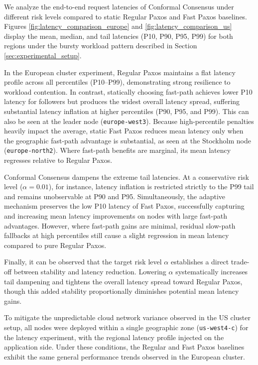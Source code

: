 We analyze the end-to-end request latencies of Conformal Consensus under different risk levels compared to static Regular Paxos and Fast Paxos baselines. Figures \ref{fig:latency_comparison_europe} and \ref{fig:latency_comparison_us} display the mean, median, and tail latencies (P10, P90, P95, P99) for both regions under the bursty workload pattern described in Section \ref{sec:experimental_setup}.

In the European cluster experiment, Regular Paxos maintains a flat latency profile across all percentiles (P10--P99), demonstrating strong resilience to workload contention. In contrast, statically choosing fast-path achieves lower P10 latency for followers but produces the widest overall latency spread, suffering substantial latency inflation at higher percentiles (P90, P95, and P99). This can also be seen at the leader node (\texttt{europe-west3}). Because high-percentile penalties heavily impact the average, static Fast Paxos reduces mean latency only when the geographic fast-path advantage is substantial, as seen at the Stockholm node (\texttt{europe-north2}). Where fast-path benefits are marginal, its mean latency regresses relative to Regular Paxos.

Conformal Consensus dampens the extreme tail latencies. At a conservative risk level ($\alpha = 0.01$), for instance, latency inflation is restricted strictly to the P99 tail and remains unobservable at P90 and P95. Simultaneously, the adaptive mechanism preserves the low P10 latency of Fast Paxos, successfully capturing and increasing mean latency improvements on nodes with large fast-path advantages. However, where fast-path gains are minimal, residual slow-path fallbacks at high percentiles still cause a slight regression in mean latency compared to pure Regular Paxos.

Finally, it can be observed that the target risk level $\alpha$ establishes a direct trade-off between stability and latency reduction. Lowering $\alpha$ systematically increases tail dampening and tightens the overall latency spread toward Regular Paxos, though this added stability proportionally diminishes potential mean latency gains.

To mitigate the unpredictable cloud network variance observed in the US cluster setup, all nodes were deployed within a single geographic zone (\texttt{us-west4-c}) for the latency experiment, with the regional latency profile injected on the application side. Under these conditions, the Regular and Fast Paxos baselines exhibit the same general performance trends observed in the European cluster.

